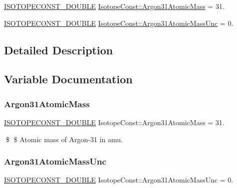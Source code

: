 \begin{DoxyCompactItemize}
\item 
\mbox{\hyperlink{group___isotope_const-_macros_ga8f45a7272ce02c0b4c65c44636ed719a}{I\+S\+O\+T\+O\+P\+E\+C\+O\+N\+S\+T\+\_\+\+D\+O\+U\+B\+LE}} \mbox{\hyperlink{group___isotope_const-_argon-_ar31_ga7c74b566d78657ab19aa8a78029ec2ed}{Isotope\+Const\+::\+Argon31\+Atomic\+Mass}} = 31.
\item 
\mbox{\hyperlink{group___isotope_const-_macros_ga8f45a7272ce02c0b4c65c44636ed719a}{I\+S\+O\+T\+O\+P\+E\+C\+O\+N\+S\+T\+\_\+\+D\+O\+U\+B\+LE}} \mbox{\hyperlink{group___isotope_const-_argon-_ar31_gafc7e804b58f764f937df7e00c754393a}{Isotope\+Const\+::\+Argon31\+Atomic\+Mass\+Unc}} = 0.
\end{DoxyCompactItemize}


\subsection{Detailed Description}


\subsection{Variable Documentation}
\mbox{\label{group___isotope_const-_argon-_ar31_ga7c74b566d78657ab19aa8a78029ec2ed}} 
\subsubsection{\texorpdfstring{Argon31\+Atomic\+Mass}{Argon31AtomicMass}}
{\footnotesize\ttfamily \mbox{\hyperlink{group___isotope_const-_macros_ga8f45a7272ce02c0b4c65c44636ed719a}{I\+S\+O\+T\+O\+P\+E\+C\+O\+N\+S\+T\+\_\+\+D\+O\+U\+B\+LE}} Isotope\+Const\+::\+Argon31\+Atomic\+Mass = 31.}

\$ \$ Atomic mass of Argon-\/31 in amu. \mbox{\label{group___isotope_const-_argon-_ar31_gafc7e804b58f764f937df7e00c754393a}} 
\subsubsection{\texorpdfstring{Argon31\+Atomic\+Mass\+Unc}{Argon31AtomicMassUnc}}
{\footnotesize\ttfamily \mbox{\hyperlink{group___isotope_const-_macros_ga8f45a7272ce02c0b4c65c44636ed719a}{I\+S\+O\+T\+O\+P\+E\+C\+O\+N\+S\+T\+\_\+\+D\+O\+U\+B\+LE}} Isotope\+Const\+::\+Argon31\+Atomic\+Mass\+Unc = 0.}

